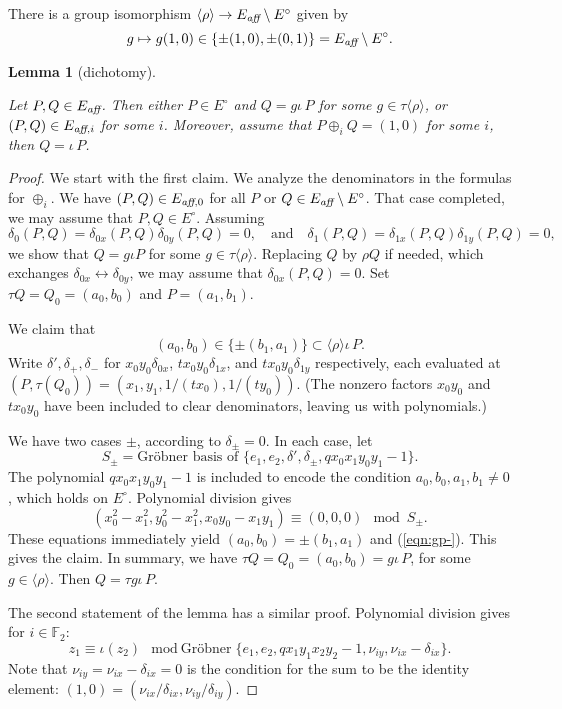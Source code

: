 \documentclass[12pt]{article}
\newtheorem{lemma}[theorem]{Lemma}
\newcommand{\ring}[1]{\mathbb{#1}}
\newcommand{\op}[1]{\hbox{#1}}
\newcommand{\Eaff}{E_{\op{\scriptsize\it aff}}}
\newcommand{\Eaf}[1]{E_{\op{\scriptsize\it aff},{#1}}}
\newcommand{\Eoo}{E^{\circ}} %
\newcommand{\Go}{\langle\rho\rangle}
\newcommand{\ang}[1]{\langle{#1}\rangle}
\begin{document}
There is a group isomorphism $\ang{\rho}\to \Eaff\setminus\Eoo$ given by
\[
g\mapsto g(1,0)\in\{\pm (1,0),\pm (0,1)\} = \Eaff\setminus \Eoo.
\]

\begin{lemma}[dichotomy]\label{lemma:noco} 
\par
\noindent  
Let $P,Q\in \Eaff$.  Then either $P\in \Eoo$ and $Q=g \iota\, P$ for
some $g\in \tau\ang{\rho}$, or $(P,Q)\in \Eaf{i}$ for some $i$.
Moreover, assume that $P\oplus_i Q = (1,0)$ for some $i$, then $Q =
\iota\,P$.
\end{lemma}

\begin{proof}  We start with the first claim.
We analyze the denominators in the formulas for $\oplus_i$.  
We have $(P,Q)\in\Eaf{0}$ for all $P$ or $Q\in \Eaff\setminus\Eoo$.
That case completed,  we may assume that $P,Q\in \Eoo$.
  Assuming
  \[
  \delta_0(P,Q) = \delta_{0x}(P,Q)\delta_{0y}(P,Q)=0,\quad\text{and}\quad
  \delta_1(P,Q) = \delta_{1x}(P,Q)\delta_{1y}(P,Q)=0,
  \]
  we show that $Q = g \iota P$ for some $g\in \tau\ang{\rho}$.
  Replacing $Q$ by $\rho Q$ if needed, which exchanges
  $\delta_{0x}\leftrightarrow \delta_{0y}$, we may assume that
  $\delta_{0x}(P,Q)=0$.  Set $\tau Q = Q_0 = (a_0,b_0)$ and
  $P=(a_1,b_1)$.  

We claim that
\begin{equation}\label{eqn:gp-}
(a_0,b_0) \in \{\pm (b_1,a_1)\} \subset \Go\iota\,P.
\end{equation}
Write $\delta',\delta_{+},\delta_{-}$ for $x_0 y_0\delta_{0x}$, $t x_0
y_0\delta_{1x}$, and $t x_0 y_0 \delta_{1y}$ respectively, each
evaluated at $(P,\tau(Q_0))=(x_1,y_1,1/(t x_0),1/(t y_0))$.  (The
nonzero factors $x_0y_0$ and $t x_0 y_0$ have been included to clear
denominators, leaving us with polynomials.)

We have two cases $\pm$, according to $\delta_{\pm}=0$.  In each case,
let
\[
S_\pm = \text{Gr\"obner basis of } \{e_1,e_2, 
\delta',\delta_{\pm},q x_0 x_1 y_0 y_1 - 1\}.
\]
The polynomial $q x_0 x_1 y_0 y_1-1$ is included to encode the
condition $a_0,b_0,a_1,b_1\ne 0$, which holds on $\Eoo$.  Polynomial
division gives
\begin{equation}\label{eqn:dichot}
(x_0^2-x_1^2,y_0^2-x_1^2,x_0 y_0 - x_1 y_1) \equiv (0,0,0) \mod S_\pm.
\end{equation}
These equations immediately yield $(a_0,b_0) = \pm (b_1,a_1)$ and
(\ref{eqn:gp-}).  This gives the claim.  In summary, we have $\tau Q =
Q_0 = (a_0,b_0) = g \iota\,P$, for some $g\in \Go$.  Then $Q = \tau g
\iota\,P$.

The second statement of the lemma has a similar proof.  Polynomial
division gives for $i\in \ring{F}_2$:
\[
z_1 \equiv \iota (z_2) \mod \text{Gr\"obner} 
\{ e_1,e_2,q x_1 y_1 x_2 y_2 -1,\nu_{i y},\nu_{i x}-\delta_{i x} \}.
\]
Note that $\nu_{i y}=\nu_{i x}-\delta_{i x}=0$ is the condition for
the sum to be the identity element:
$(1,0)=(\nu_{ix}/\delta_{ix},\nu_{iy}/\delta_{iy})$.
\end{proof}
\end{document}
